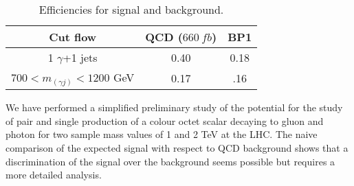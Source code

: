      \begin{table}[h!]
 	\begin{center}
 		\begin{tabular}{|c|c|c|} 
 			\hline
 			Cut flow           & QCD ($660~fb$)  & BP1\\ \hline
 			\hline
 			1 $\gamma$+1 jets         &0.40&0.18\\ \hline  
 			$700<m_(\gamma j) <1200$ GeV&0.17&.16 \\
 			\hline 
 		\end{tabular}
 		\caption{\label{tab:single}  Efficiencies for signal and background. } 
 	\end{center}
 \end{table}
 We have performed a simplified preliminary study of the potential for the study of pair and single production of a colour octet scalar decaying to gluon 
 and photon for two sample mass values of 1 and 2 TeV at the LHC. The naive comparison of the expected signal with respect to QCD background 
 shows that a discrimination of the signal over the background seems possible but requires a more detailed analysis.	
 
